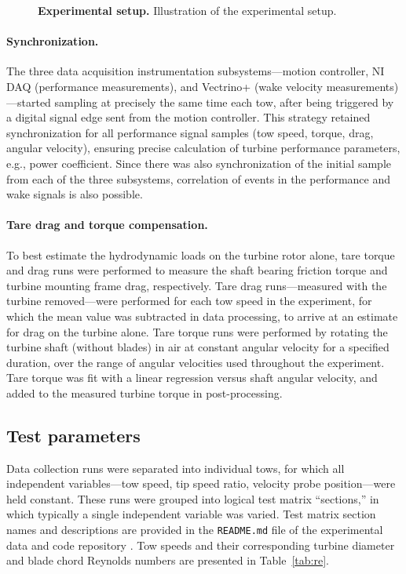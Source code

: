 \documentclass[10pt,letterpaper]{article}
\begin{document}
\begin{figure}
    \centering


    \caption{{\bf Experimental setup.} Illustration of the experimental setup.}

    \label{fig:exp-setup}
\end{figure}


\paragraph{Synchronization.} The three data acquisition instrumentation
subsystems---motion controller, NI DAQ (performance measurements), and Vectrino+
(wake velocity measurements)---started sampling at precisely the same time each
tow, after being triggered by a digital signal edge sent from the motion
controller. This strategy retained synchronization for all performance signal
samples (tow speed, torque, drag, angular velocity), ensuring precise
calculation of turbine performance parameters, e.g., power coefficient. Since
there was also synchronization of the initial sample from each of the three
subsystems, correlation of events in the performance and wake signals is also
possible.

\paragraph{Tare drag and torque compensation.} To best estimate the hydrodynamic
loads on the turbine rotor alone, tare torque and drag runs were performed to
measure the shaft bearing friction torque and turbine mounting frame drag,
respectively. Tare drag runs---measured with the turbine removed---were
performed for each tow speed in the experiment, for which the mean value was
subtracted in data processing, to arrive at an estimate for drag on the turbine
alone. Tare torque runs were performed by rotating the turbine shaft (without
blades) in air at constant angular velocity for a specified duration, over the
range of angular velocities used throughout the experiment. Tare torque was fit
with a linear regression versus shaft angular velocity, and added to the
measured turbine torque in post-processing.


\subsection*{Test parameters}

Data collection runs were separated into individual tows, for which all
independent variables---tow speed, tip speed ratio, velocity probe
position---were held constant. These runs were grouped into logical test matrix
``sections,'' in which typically a single independent variable was varied. Test
matrix section names and descriptions are provided in the \texttt{README.md}
file of the experimental data and code repository \cite{Bachant2016-RM2-data}.
Tow speeds and their corresponding turbine diameter and blade chord Reynolds
numbers are presented in Table~\ref{tab:re}.
\end{document}
